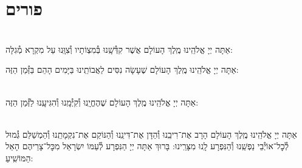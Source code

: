 \documentclass[twoside, openany, parskip=half, 11pt]{book}
\begin{document}
\vfill
\sepline

\chapter[פורים]{ פורים }

\label{purim}

\\
אַתָּה יְיָ אֱלֹהֵֽינוּ מֶֽלֶךְ הָעוֹלָם
אֲשֶׁר קִדְּ֯שָֽׁנוּ בְּ֯מִצְוֹתָיו וְ֯צִוָּֽנוּ עַל מִקְרָא מְ֯גִלָּה:


אַתָּה יְיָ אֱלֹהֵֽינוּ מֶֽלֶךְ הָעוֹלָם שֶׁעָשָׂה נִסִּים לַאֲבוֹתֵֽינוּ בַּיָּמִים הָהֵם בַּזְּ֯מַן הַזֶּה:

\\
אַתָּה יְיָ אֱלֹהֵֽינוּ מֶֽלֶךְ הָעוֹלָם שֶׁהֶחֱיָֽנוּ וְ֯קִיְּ֯מָֽנוּ וְ֯הִגִּיעָֽנוּ לַזְּ֯מַן הַזֶּה:


 \\
אַתָּה יְיָ אֱלֹהֵֽינוּ מֶֽלֶךְ הָעוֹלָם הָרָב אֶת־רִיבֵֽנוּ וְ֯הַדָּן אֶת־דִּינֵֽנוּ וְ֯הַנּוֹקֵם אֶת־נִקְמָתֵֽנוּ וְ֯הַמְשַׁלֵּם גְּ֯מוּל לְ֯כׇל־אוֹיְ֯בֵי נַפְשֵֽׁנוּ וְ֯הַנִּפְרָע לָֽנוּ מִצָּרֵֽינוּ: בָּרוּךְ אַתָּה יְיָ הַנִּפְרָע לְ֯עַמּוֹ יִשְׂרָאֵל מִכׇּל־צָרֵיהֶם הָאֵל הַמּוֹשִֽׁיעַ:

\end{document}
